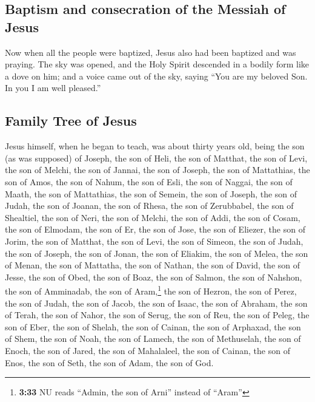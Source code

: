 \begin{paracol}{2}
\begin{otherlanguage}{english}
\hypertarget{baptism-and-consecration-of-the-messiah-of-jesus}{%
\subsection{Baptism and consecration of the Messiah of
Jesus}\label{baptism-and-consecration-of-the-messiah-of-jesus}}

 Now when all the people were baptized, Jesus also had
been baptized and was praying. The sky was opened,  and
the Holy Spirit descended in a bodily form like a dove on him; and a
voice came out of the sky, saying ``You are my beloved Son. In you I am
well pleased.''

\hypertarget{family-tree-of-jesus}{%
\subsection{Family Tree of Jesus}\label{family-tree-of-jesus}}

 Jesus himself, when he began to teach, was about thirty
years old, being the son (as was supposed) of Joseph, the son of Heli,
 the son of Matthat, the son of Levi, the son of Melchi,
the son of Jannai, the son of Joseph,  the son of
Mattathias, the son of Amos, the son of Nahum, the son of Esli, the son
of Naggai,  the son of Maath, the son of Mattathias, the
son of Semein, the son of Joseph, the son of Judah,  the
son of Joanan, the son of Rhesa, the son of Zerubbabel, the son of
Shealtiel, the son of Neri,  the son of Melchi, the son
of Addi, the son of Cosam, the son of Elmodam, the son of Er,
 the son of Jose, the son of Eliezer, the son of Jorim,
the son of Matthat, the son of Levi,  the son of Simeon,
the son of Judah, the son of Joseph, the son of Jonan, the son of
Eliakim,  the son of Melea, the son of Menan, the son of
Mattatha, the son of Nathan, the son of David,  the son
of Jesse, the son of Obed, the son of Boaz, the son of Salmon, the son
of Nahshon,  the son of Amminadab, the son of
Aram,\footnote{\textbf{3:33} NU reads ``Admin, the son of Arni'' instead
  of ``Aram''} the son of Hezron, the son of Perez, the son of Judah,
 the son of Jacob, the son of Isaac, the son of Abraham,
the son of Terah, the son of Nahor,  the son of Serug,
the son of Reu, the son of Peleg, the son of Eber, the son of Shelah,
 the son of Cainan, the son of Arphaxad, the son of Shem,
the son of Noah, the son of Lamech,  the son of
Methuselah, the son of Enoch, the son of Jared, the son of Mahalaleel,
the son of Cainan,  the son of Enos, the son of Seth, the
son of Adam, the son of God.


\end{otherlanguage}
\end{paracol}
